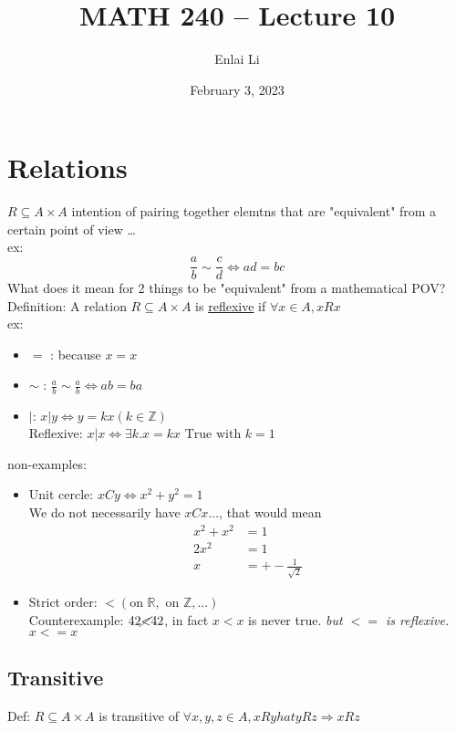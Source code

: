 \documentclass{article}
\author{Enlai Li}
\title{MATH 240 -- Lecture 10}
\date{February 3, 2023}
\begin{document}
\maketitle

\section{Relations}

$R \subseteq A \times A$ intention of pairing together elemtns that are "equivalent" from a certain point of view \dots
\\ex:
\[
    \frac{a}{b} \sim \frac{c}{d} \iff ad = bc
\]
What does it mean for 2 things to be "equivalent" from a mathematical POV?
Definition: A relation $R \subseteq A \times A$ is \underline{reflexive} if $\forall x \in A, x R x$
\\ex:
\begin{itemize}
    \item $=$ : because $x = x$
    \item $\sim \text{ : } \frac{a}{b} \sim \frac{a}{b} \iff ab = ba$
    \item $| \text{: } x|y \iff y = kx ( k \in \mathbb{Z})$ \\
          Reflexive: $x|x \iff \exists k. x = kx \text{ True with } k=1$
\end{itemize}
non-examples:
\begin{itemize}
    \item Unit cercle: $xCy \iff x^2+y^2 = 1$ \\
          We do not necessarily have $xCx \dots$, that would mean \begin{align*}
              x^2 + x^2 & = 1                     \\
              2x ^{2}   & = 1                     \\
              x         & = +- \frac{1}{\sqrt{2}}
          \end{align*}

    \item Strict order: $< (\text{on } \mathbb{R}, \text{ on } \mathbb{Z}, \dots)$ \\
          Counterexample: $42 \cancel{<} 42$, in fact $x < x$ is never true. \textit{but $<=$ is reflexive. $x <= x$}
\end{itemize}

\subsection{Transitive}
Def: $R \subseteq A \times A$ is transitive of $\forall x,y,z \in A, xRy hat yRz \Rightarrow xRz$
\end{document}
